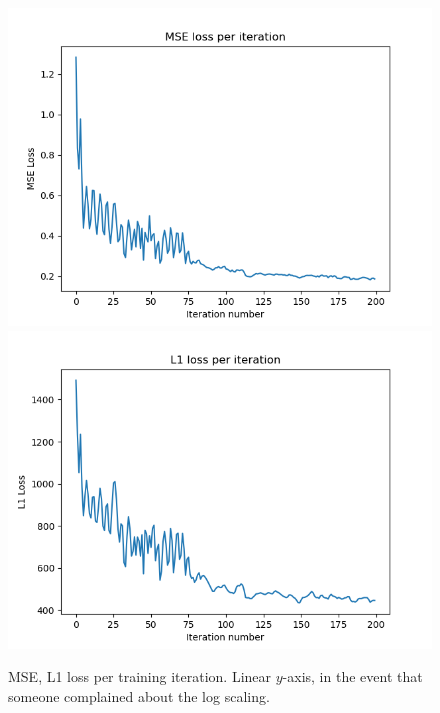 \begin{figure}[h]
  \centering
  \includegraphics[scale=0.7]{figures/10-16-20-mse-linear.png}
  \includegraphics[scale=0.7]{figures/10-16-20-l1-linear.png}
  \caption{MSE, L1 loss per training iteration.  Linear $y$-axis, in the event that someone complained about the log scaling.}
  \label{fig:loss_linear}
\end{figure}

